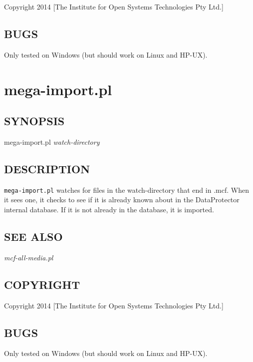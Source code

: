 \documentclass{article}
\begin{document}
Copyright 2014 [The Institute for Open Systems Technologies Pty Ltd.]

\subsection*{BUGS\label{mcf-all-media_pl_BUGS}}


Only tested on Windows (but should work on Linux and HP-UX).

\clearpage
\section{mega-import.pl\label{mega-import_pl}}




\subsection*{SYNOPSIS\label{mega-import_pl_SYNOPSIS}}


mega-import.pl \textit{watch-directory}

\subsection*{DESCRIPTION\label{mega-import_pl_DESCRIPTION}}


\texttt{mega-import.pl} watches for files in the watch-directory that end in .mcf. When it sees 
one, it checks to see if it is already known about in the DataProtector internal database. 
If it is not already in the database, it is imported.

\subsection*{SEE ALSO\label{mega-import_pl_SEE_ALSO}}


\emph{mcf-all-media.pl}

\subsection*{COPYRIGHT\label{mega-import_pl_COPYRIGHT}}


Copyright 2014 [The Institute for Open Systems Technologies Pty Ltd.]

\subsection*{BUGS\label{mega-import_pl_BUGS}}


Only tested on Windows (but should work on Linux and HP-UX).

\printindex
\end{document}
